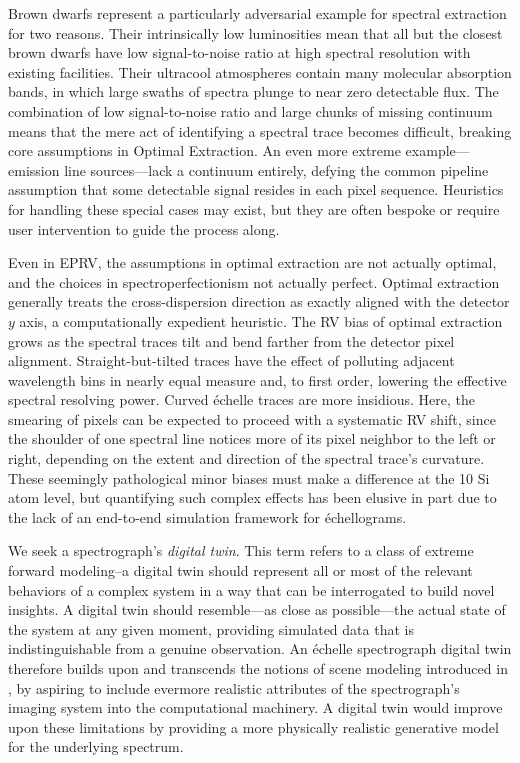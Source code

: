 \documentclass[twocolumn]{aastex631}
\begin{document}
Brown dwarfs represent a particularly adversarial example for spectral extraction for two reasons.  Their intrinsically low luminosities mean that all but the closest brown dwarfs have low signal-to-noise ratio at high spectral resolution with existing facilities.  Their ultracool atmospheres contain many molecular absorption bands, in which large swaths of spectra plunge to near zero detectable flux.  The combination of low signal-to-noise ratio and large chunks of missing continuum means that the mere act of identifying a spectral trace becomes difficult, breaking core assumptions in Optimal Extraction.  An even more extreme example---emission line sources---lack a continuum entirely, defying the common pipeline assumption that some detectable signal resides in each pixel sequence.  Heuristics for handling these special cases may exist, but they are often bespoke or require user intervention to guide the process along.

Even in EPRV, the assumptions in optimal extraction are not actually optimal, and the choices in spectroperfectionism not actually perfect.  Optimal extraction generally treats the cross-dispersion direction as exactly aligned with the detector $y$ axis, a computationally expedient heuristic. The RV bias of optimal extraction grows as the spectral traces tilt and bend farther from the detector pixel alignment.  Straight-but-tilted traces have the effect of polluting adjacent wavelength bins in nearly equal measure and, to first order, lowering the effective spectral resolving power.  Curved \'echelle traces are more insidious.  Here, the smearing of pixels can be expected to proceed with a systematic RV shift, since the shoulder of one spectral line notices more of its pixel neighbor to the left or right, depending on the extent and direction of the spectral trace's curvature.  These seemingly pathological minor biases must make a difference at the 10 Si atom level, but quantifying such complex effects has been elusive in part due to the lack of an end-to-end simulation framework for \'echellograms.

We seek a spectrograph's \emph{digital twin}.  This term refers to a class of extreme forward modeling--a digital twin should represent all or most of the relevant behaviors of a complex system in a way that can be interrogated to build novel insights.  A digital twin should resemble---as close as possible---the actual state of the system at any given moment, providing simulated data that is indistinguishable from a genuine observation.  An \'echelle spectrograph digital twin therefore builds upon and transcends the notions of scene modeling introduced in \citet{2010PASP..122..248B}, by aspiring to include evermore realistic attributes of the spectrograph's imaging system into the computational machinery.  A digital twin would improve upon these limitations by providing a more physically realistic generative model for the underlying spectrum.
\end{document}
